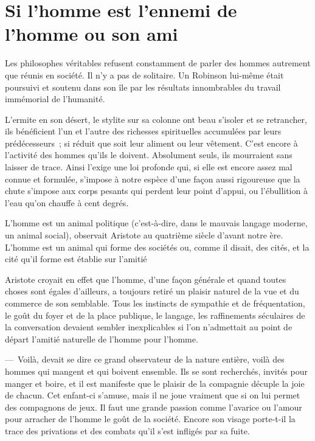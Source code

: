 \documentclass[french,twoside]{book} %
\begin{document}
\section[Si l’homme est l’ennemi de l’homme ou son ami]{Si l’homme est l’ennemi de l’homme ou son ami}
\noindent Les philosophes véritables refusent constamment de parler des hommes autrement que réunis en société. Il n’y a pas de solitaire. Un Robinson lui-même était poursuivi et soutenu dans son île par les résultats innombrables du travail immémorial de l’humanité.\par
L’ermite en son désert, le stylite sur sa colonne ont beau s’isoler et se retrancher, ils bénéficient l’un et l’autre des richesses spirituelles accumulées par leurs prédécesseurs ; si réduit que soit leur aliment ou leur vêtement. C’est encore à l’activité des hommes qu’ils le doivent. Absolument seuls, ils mourraient sans laisser de trace. Ainsi l’exige une loi profonde qui, si elle est encore assez mal connue et formulée, s’impose à notre espèce d’une façon aussi rigoureuse que la chute s’impose aux corps pesants qui perdent leur point d’appui, ou l’ébullition à l’eau qu’on chauffe à cent degrés.\par
L’homme est un animal politique (c’est-à-dire, dans le mauvais langage moderne, un animal social), observait Aristote au quatrième siècle d’avant notre ère. L’homme est un animal qui forme des sociétés ou, comme il disait, des cités, et la cité qu’il forme est établie sur l’amitié\par
Aristote croyait en effet que l’homme, d’une façon générale et quand toutes choses sont égales d’ailleurs, a toujours retiré un plaisir naturel de la vue et du commerce de son semblable. Tous les instincts de sympathie et de fréquentation, le goût du foyer et de la place publique, le langage, les raffinements séculaires de la conversation devaient sembler inexplicables si l’on n’admettait au point de départ l’amitié naturelle de l’homme pour l’homme.\par
— Voilà, devait se dire ce grand observateur de la nature entière, voilà des hommes qui mangent et qui boivent ensemble. Ils se sont recherchés, invités pour manger et boire, et il est manifeste que le plaisir de la compagnie décuple la joie de chacun. Cet enfant-ci s’amuse, mais il ne joue vraiment que si on lui permet des compagnons de jeux. Il faut une grande passion comme l’avarice ou l’amour pour arracher de l’homme le goût de la société. Encore son visage porte-t-il la trace des privations et des combats qu’il s’est infligés par sa fuite.\par
\end{document}
